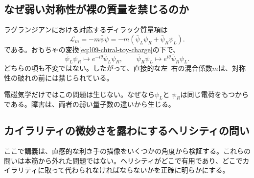 \subsection{なぜ弱い対称性が裸の質量を禁じるのか}

ラグランジアンにおける対応するディラック質量項は
\begin{equation}
  \mathcal L_m
  =-m\bar\psi\psi
  =-m\left(\bar\psi_L\psi_R+\bar\psi_R\psi_L\right).
  \label{eq:l09-bare-dirac-mass}
\end{equation}
である。おもちゃの変換\eqref{eq:l09-chiral-toy-charge}の下で、
\begin{equation}
  \bar\psi_L\psi_R\longmapsto
  e^{-i\theta}\bar\psi_L\psi_R,
  \qquad
  \bar\psi_R\psi_L\longmapsto
  e^{i\theta}\bar\psi_R\psi_L.
\end{equation}
どちらの項も不変ではない。したがって、直接的な左--右の混合係数\(m\)は、対称性の破れの前には禁じられている。

電磁気学だけではこの問題は生じない。なぜなら\(\psi_L\)と
\(\psi_R\)は同じ電荷をもつからである。障害は、両者の弱い量子数の違いから生じる。

\subsection{カイラリティの微妙さを露わにするヘリシティの問い}

ここで講義は、直感的な利き手の描像をいくつかの角度から検証する。これらの問いは本筋から外れた問題ではない。ヘリシティがどこで有用であり、どこでカイラリティに取って代わられなければならないかを正確に明らかにする。

\begin{classroomqa}
\end{classroomqa}

\begin{classroomqa}
\end{classroomqa}

